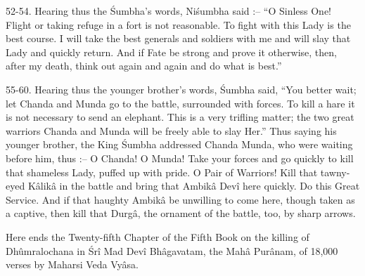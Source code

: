 52-54. Hearing thus the \'Sumbha's words, Ni\'sumbha said :-- ``O Sinless One! Flight or taking refuge in a fort is not reasonable. To fight with this Lady is the best course. I will take the best generals and soldiers with me and will slay that Lady and quickly return. And if Fate be strong and prove it otherwise, then, after my death, think out again and again and do what is best.''

55-60. Hearing thus the younger brother's words, \'Sumbha said, ``You better wait; let Chanda and Munda go to the battle, surrounded with forces. To kill a hare it is not necessary to send an elephant. This is a very trifling matter; the two great warriors Chanda and Munda will be freely able to slay Her.'' Thus saying his younger brother, the King \'Sumbha addressed Chanda Munda, who were waiting before him, thus :-- O Chanda! O Munda! Take your forces and go quickly to kill that shameless Lady, puffed up with pride. O Pair of Warriors! Kill that tawny-eyed K\^alik\^a in the battle and bring that Ambik\^a Dev\^i here quickly. Do this Great Service. And if that haughty Ambik\^a be unwilling to come here, though taken as a captive, then kill that Durg\^a, the ornament of the battle, too, by sharp arrows.

Here ends the Twenty-fifth Chapter of the Fifth Book on the killing of Dh\^umralochana in \'Sr\^i Mad Dev\^i Bh\^agavatam, the Mah\^a Pur\^anam, of 18,000 verses by Maharsi Veda Vy\^asa.